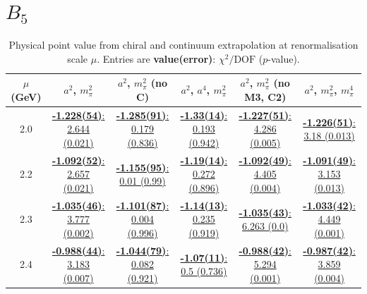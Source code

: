 \documentclass[12pt]{extarticle}
\begin{document}
\section{$B_5$}
\begin{table}[h!]
\begin{center}
\begin{tabular}{|c|c|c|c|c|c|}
\hline
$\mu$ (GeV) & $a^2$, $m_\pi^2$& $a^2$, $m_\pi^2$ (no C)& $a^2$, $a^4$, $m_\pi^2$& $a^2$, $m_\pi^2$ (no M3, C2)& $a^2$, $m_\pi^2$, $m_\pi^4$\\
\hline
2.0& \hyperlink{TT/SUSY/a2m2_20.pdf.1}{\textbf{-1.228(54)}: 2.644 (0.021)} & \hyperlink{TT/SUSY/a2m2noC_20.pdf.1}{\textbf{-1.285(91)}: 0.179 (0.836)} & \hyperlink{TT/SUSY/a2a4m2_20.pdf.1}{\textbf{-1.33(14)}: 0.193 (0.942)} & \hyperlink{TT/SUSY/a2m2mcut_20.pdf.1}{\textbf{-1.227(51)}: 4.286 (0.005)} & \hyperlink{TT/SUSY/a2m2m4_20.pdf.1}{\textbf{-1.226(51)}: 3.18 (0.013)}\\
2.2& \hyperlink{TT/SUSY/a2m2_22.pdf.1}{\textbf{-1.092(52)}: 2.657 (0.021)} & \hyperlink{TT/SUSY/a2m2noC_22.pdf.1}{\textbf{-1.155(95)}: 0.01 (0.99)} & \hyperlink{TT/SUSY/a2a4m2_22.pdf.1}{\textbf{-1.19(14)}: 0.272 (0.896)} & \hyperlink{TT/SUSY/a2m2mcut_22.pdf.1}{\textbf{-1.092(49)}: 4.405 (0.004)} & \hyperlink{TT/SUSY/a2m2m4_22.pdf.1}{\textbf{-1.091(49)}: 3.153 (0.013)}\\
2.3& \hyperlink{TT/SUSY/a2m2_23.pdf.1}{\textbf{-1.035(46)}: 3.777 (0.002)} & \hyperlink{TT/SUSY/a2m2noC_23.pdf.1}{\textbf{-1.101(87)}: 0.004 (0.996)} & \hyperlink{TT/SUSY/a2a4m2_23.pdf.1}{\textbf{-1.14(13)}: 0.235 (0.919)} & \hyperlink{TT/SUSY/a2m2mcut_23.pdf.1}{\textbf{-1.035(43)}: 6.263 (0.0)} & \hyperlink{TT/SUSY/a2m2m4_23.pdf.1}{\textbf{-1.033(42)}: 4.449 (0.001)}\\
2.4& \hyperlink{TT/SUSY/a2m2_24.pdf.1}{\textbf{-0.988(44)}: 3.183 (0.007)} & \hyperlink{TT/SUSY/a2m2noC_24.pdf.1}{\textbf{-1.044(79)}: 0.082 (0.921)} & \hyperlink{TT/SUSY/a2a4m2_24.pdf.1}{\textbf{-1.07(11)}: 0.5 (0.736)} & \hyperlink{TT/SUSY/a2m2mcut_24.pdf.1}{\textbf{-0.988(42)}: 5.294 (0.001)} & \hyperlink{TT/SUSY/a2m2m4_24.pdf.1}{\textbf{-0.987(42)}: 3.859 (0.004)}\\
\hline
\end{tabular}
\caption{Physical point value from chiral and continuum extrapolation at renormalisation scale $\mu$. Entries are \textbf{value(error)}: $\chi^2/\text{DOF}$ ($p$-value).}
\end{center}
\end{table}
\end{document}
